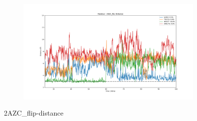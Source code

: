 \documentclass[fleqn,10pt]{wlscirep}
\begin{document}
\begin{figure}[!ht]
\begin{subfigure}{.45\textwidth}
   \end{subfigure}
    \begin{subfigure}{.45\textwidth}
     \centering
     \includegraphics[width=.95\linewidth]{2AZC_flip/2AZC_flip-dist_4.png}
   \end{subfigure}
\caption{2AZC_{flip}-distance}
\label{sup:2AZC_flip-dist}
\end{figure}  
\end{document}

